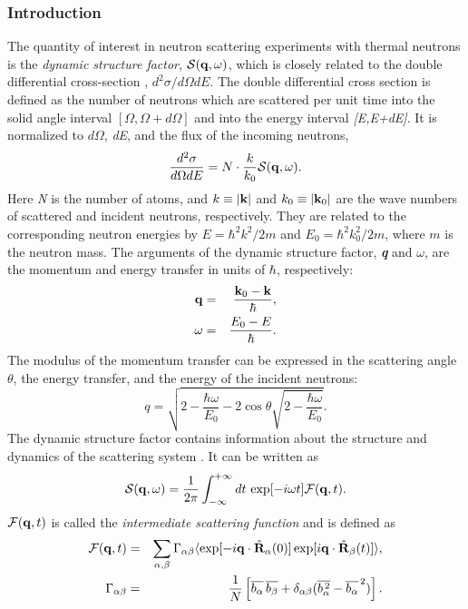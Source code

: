 \documentclass[a4paper,11pt]{report}
\begin{document}
\subsubsection{Introduction\\}
\label{scattering_introduction}
The quantity of interest in neutron scattering experiments with thermal neutrons is the {\em dynamic structure factor}, 
${\cal S}({\bf q},\omega)$, which is closely related to the double differential cross-section \cite{Lovesey}, 
$d^2\sigma/d\Omega dE$.  The double differential cross section is defined as the number of neutrons which
are scattered per unit time into the solid angle interval $[\Omega,\Omega+d\Omega]$ and into the energy interval \textit{[E,E+dE]}. 
It is normalized to $d\Omega$, \textit{dE}, and the flux of the incoming neutrons,
\begin{equation}
\label{eq:sqw_1}
\frac{d^{2}\sigma}{d\Omega dE} = N\cdot\frac{k}{k_0}{\cal S}({\bf q},\omega).
\end{equation}
Here \textit{N} is the number of atoms, and $k\equiv|{\bf k}|$  and $k_0\equiv |{\bf k}_0|$ are the wave numbers of scattered and 
incident neutrons, respectively. They are related to the corresponding neutron energies by 
$E = \hbar^2 k^2/2m$ and $E_0 = \hbar^2 k_0^2/2m$, where $m$ is the neutron mass. The arguments of the dynamic structure 
factor, \textit{\textbf{q}} and $\omega$, are the momentum and energy transfer in units of $\hbar$, respectively:
\begin{eqnarray}
{\bf q} &= &\frac{{\bf k}_0 - {\bf k}}{\hbar},\\
\omega  &= &\frac{E_0 - E}{\hbar}.
\end{eqnarray}
The modulus of the momentum transfer can be expressed in the scattering angle $\theta$, the energy transfer, and the energy of 
the incident neutrons:
\begin{equation}
q = \sqrt{2 - \frac{\hbar\omega}{E_0} 
          - 2\cos\theta\sqrt{2 - \frac{\hbar\omega}{E_0}}}.
\end{equation}
The dynamic structure factor contains information about the structure and dynamics of the scattering system \cite{VanHove}.
It can be written as 
\begin{equation}
\label{eq:sqw_2}
{\cal S}({\bf q},\omega) = \frac{1}{2\pi}\int_{-\infty}^{+\infty}dt\, \exp[-i\omega t]{\cal F}({\bf q},t).
\end{equation}
${\cal F}({\bf q},t)$ is called the {\em intermediate scattering function} and is defined as
\begin{eqnarray}
\label{eq:fqt}
{\cal F}({\bf q},t) &= &\sum_{\alpha,\beta}\Gamma_{\alpha\beta}
\langle\exp[-i{\bf q}\cdot\hat{\bf R}_\alpha(0)]
       \exp[i{\bf q}\cdot\hat{\bf R}_\beta(t)]\rangle,\\
\label{eq:gamma}
\Gamma_{\alpha\beta} &= &\frac{1}{N}
\left[\overline{\mbox{$b_\alpha$}}\,\overline{\mbox{$b_\beta$}} 
+ \delta_{\alpha\beta}
 (\overline{b_\alpha^{\,2}} - \overline{b_\alpha}^{\,2})\right].
\end{eqnarray}
\end{document}
